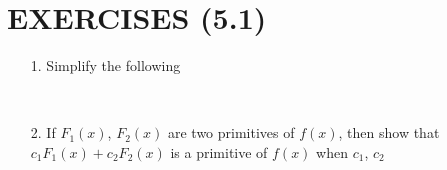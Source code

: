 \documentclass[11pt]{amsbook}
\begin{document}
\section*{EXERCISES (5.1)}
\begin{enumerate}
	\item[1.] Simplify the following \\
	 \\

	\item[2.] If $F_1(x)$, $F_2(x)$ are two primitives of $f(x)$, then show that $c_1 F_1(x)+c_2 F_2(x)$ is a primitive of $f(x)$ when $c_1$, $c_2$
\end{enumerate}
\end{document}
